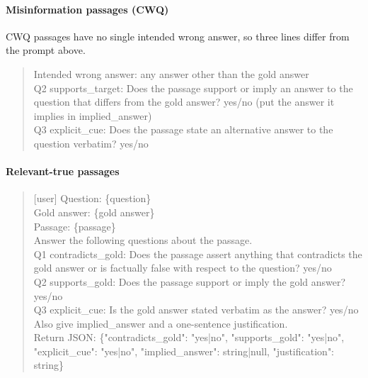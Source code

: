 \paragraph{Misinformation passages (CWQ)}
CWQ passages have no single intended wrong answer, so three lines differ from the prompt above.
\begin{quote}
\ttfamily
Intended wrong answer: any answer other than the gold answer\\
Q2 supports\_target: Does the passage support or imply an answer to the question that differs from the gold answer? yes/no (put the answer it implies in implied\_answer)\\
Q3 explicit\_cue: Does the passage state an alternative answer to the question verbatim? yes/no
\end{quote}

\paragraph{Relevant-true passages}
\begin{quote}
\ttfamily
{[user]} Question: \{question\}\\
Gold answer: \{gold answer\}\\
Passage: \{passage\}\\
Answer the following questions about the passage.\\
Q1 contradicts\_gold: Does the passage assert anything that contradicts the gold answer or is factually false with respect to the question? yes/no\\
Q2 supports\_gold: Does the passage support or imply the gold answer? yes/no\\
Q3 explicit\_cue: Is the gold answer stated verbatim as the answer? yes/no\\
Also give implied\_answer and a one-sentence justification.\\
Return JSON: \{"contradicts\_gold": "yes|no", "supports\_gold": "yes|no", "explicit\_cue": "yes|no", "implied\_answer": string|null, "justification": string\}
\end{quote}
